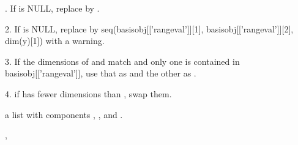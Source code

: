 \begin{Details}.  If  is NULL, replace by .

2.  If  is NULL, replace by
seq(basisobj[['rangeval']][1], basisobj[['rangeval']][2], dim(y)[1])
with a warning.  

3.  If the dimensions of  and  match and only
one is contained in basisobj[['rangeval']], use that as 
and the other as .

4.  if  has fewer dimensions than , swap them.
\end{Details}
\begin{Value}
a list with components , , and .
\end{Value}
\begin{SeeAlso}\relax
{} 
, 
\end{SeeAlso}

